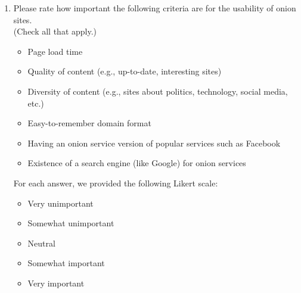 \begin{enumerate}
    \item Please rate how important the following criteria are for the
        usability of onion sites.\\(Check all that apply.)
        \begin{itemize}
            \item Page load time
            \item Quality of content (e.g., up-to-date, interesting sites)
            \item Diversity of content (e.g., sites about politics, technology, social media, etc.)
            \item Easy-to-remember domain format
            \item Having an onion service version of popular services such as Facebook
            \item Existence of a search engine (like Google) for onion services
        \end{itemize}
        For each answer, we provided the following Likert scale:
        \begin{itemize}
            \item Very unimportant
            \item Somewhat unimportant
            \item Neutral
            \item Somewhat important
            \item Very important
        \end{itemize}
\end{enumerate}

